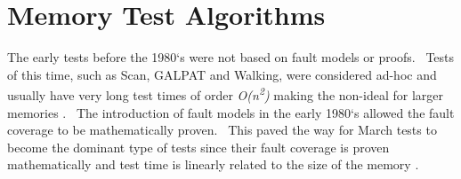 \section{Memory Test Algorithms}
\label{sect:bg-algorithms}
The early tests before the 1980`s were not based on fault models or proofs.  Tests of this time, such as Scan, GALPAT and Walking, were considered ad-hoc and usually have very long test times of order \textit{O(n\textsuperscript{2})} making the non-ideal for larger memories \cite{1327984}.  The introduction of fault models in the early 1980`s allowed the fault coverage to be mathematically proven.  This paved the way for March tests to become the dominant type of tests since their fault coverage is proven mathematically and test time is linearly related to the size of the memory \cite{1327984}.  









